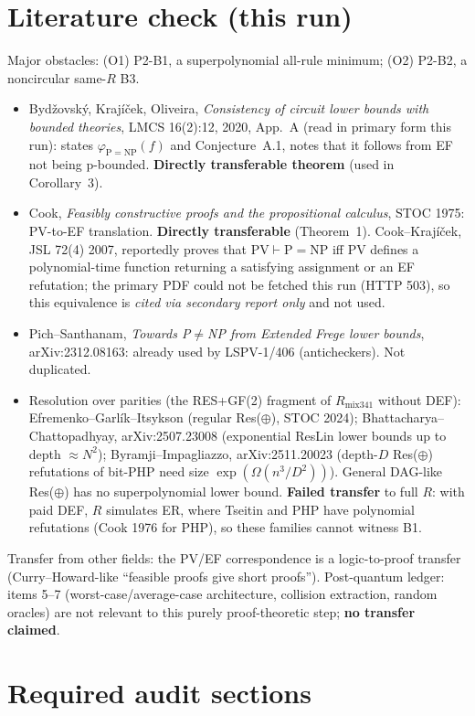 \documentclass[11pt]{article}
\begin{document}
\section{Literature check (this run)}
Major obstacles: (O1) P2-B1, a superpolynomial all-rule minimum; (O2) P2-B2, a
noncircular same-$R$ B3.
\begin{itemize}
\item Bydžovský, Krajíček, Oliveira, \emph{Consistency of circuit lower bounds
with bounded theories}, LMCS 16(2):12, 2020, App.~A (read in primary form this
run): states $\varphi_{\mathrm{P=NP}}(f)$ and Conjecture~A.1, notes that it
follows from EF not being p-bounded. \textbf{Directly transferable theorem}
(used in Corollary~3).
\item Cook, \emph{Feasibly constructive proofs and the propositional calculus},
STOC 1975: PV-to-EF translation. \textbf{Directly transferable} (Theorem~1).
Cook--Krajíček, JSL 72(4) 2007, reportedly proves that PV$\vdash$P$=$NP iff
PV defines a polynomial-time function returning a satisfying assignment or an
EF refutation; the primary PDF could not be fetched this run (HTTP 503), so this
equivalence is \emph{cited via secondary report only} and not used.
\item Pich--Santhanam, \emph{Towards P$\neq$NP from Extended Frege lower bounds},
arXiv:2312.08163: already used by LSPV-1/406 (anticheckers). Not duplicated.
\item Resolution over parities (the RES+GF(2) fragment of $R_{\mathrm{mix341}}$
without DEF): Efremenko--Garlík--Itsykson (regular Res($\oplus$), STOC 2024);
Bhattacharya--Chattopadhyay, arXiv:2507.23008 (exponential ResLin lower bounds
up to depth $\approx N^2$); Byramji--Impagliazzo, arXiv:2511.20023 (depth-$D$
Res($\oplus$) refutations of bit-PHP need size $\exp(\Omega(n^3/D^2))$). General
DAG-like Res($\oplus$) has no superpolynomial lower bound. \textbf{Failed
transfer} to full $R$: with paid DEF, $R$ simulates ER, where Tseitin and PHP
have polynomial refutations (Cook 1976 for PHP), so these families cannot
witness B1.
\end{itemize}
Transfer from other fields: the PV/EF correspondence is a logic-to-proof
transfer (Curry--Howard-like ``feasible proofs give short proofs'').
Post-quantum ledger: items 5--7 (worst-case/average-case architecture,
collision extraction, random oracles) are not relevant to this purely
proof-theoretic step; \textbf{no transfer claimed}.

\section{Required audit sections}
\end{document}
